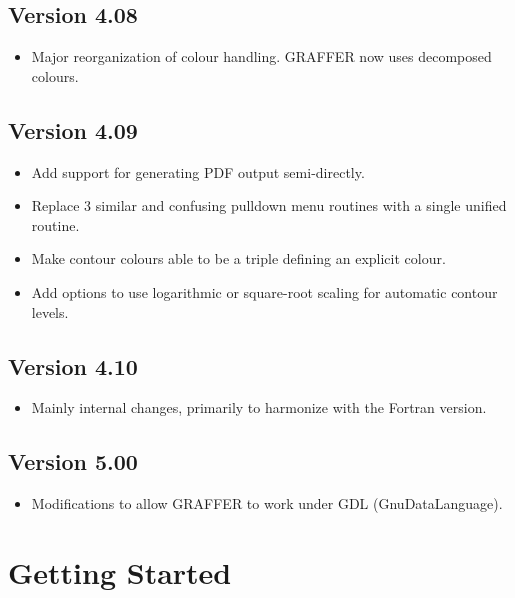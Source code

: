 \documentclass[11pt,twoside,english]{article}
\begin{document}
\subsection{Version 4.08}
\label{sec:v408}

\begin{itemize}
\item Major reorganization of colour handling. GRAFFER now uses
  decomposed colours. 
\end{itemize}

\subsection{Version 4.09}
\label{sec:v409}

\begin{itemize}
\item Add support for generating PDF output semi-directly.
\item Replace 3 similar and confusing pulldown menu routines with a
  single unified routine.
\item Make contour colours able to be a triple defining an explicit
  colour.
\item Add options to use logarithmic or square-root scaling for
  automatic contour levels.
\end{itemize}

\subsection{Version 4.10}
\label{sec:v410}

\begin{itemize}
\item Mainly internal changes, primarily to harmonize with the Fortran
  version.
\end{itemize}

\subsection{Version 5.00}
\label{sec:v500}

\begin{itemize}
\item Modifications to allow GRAFFER to work under GDL (GnuDataLanguage).
\end{itemize}


\section{Getting Started}
\end{document}
